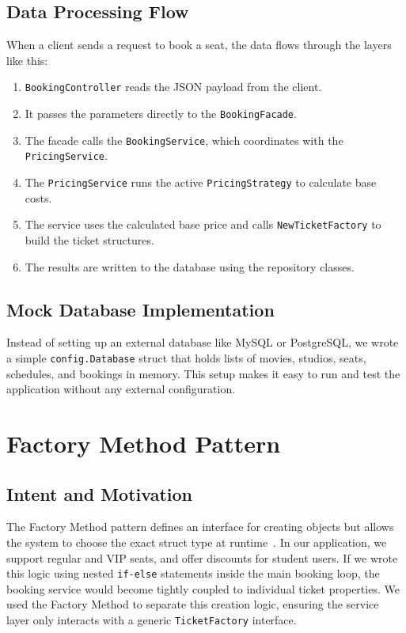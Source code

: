 \documentclass[conference]{IEEEtran}
\begin{document}
\subsection{Data Processing Flow}

When a client sends a request to book a seat, the data flows through the layers like this:

\begin{enumerate}
  \item \texttt{BookingController} reads the JSON payload from the client.
  \item It passes the parameters directly to the \texttt{BookingFacade}.
  \item The facade calls the \texttt{BookingService}, which coordinates with the \texttt{PricingService}.
  \item The \texttt{PricingService} runs the active \texttt{PricingStrategy} to calculate base costs.
  \item The service uses the calculated base price and calls \texttt{NewTicketFactory} to build the ticket structures.
  \item The results are written to the database using the repository classes.
\end{enumerate}

\subsection{Mock Database Implementation}

Instead of setting up an external database like MySQL or PostgreSQL, we wrote a simple \texttt{config.Database} struct that holds lists of movies, studios, seats, schedules, and bookings in memory. This setup makes it easy to run and test the application without any external configuration.

\section{Factory Method Pattern}
\label{sec:factory}

\subsection{Intent and Motivation}

The Factory Method pattern defines an interface for creating objects but allows the system to choose the exact struct type at runtime~\cite{gamma1994design}. In our application, we support regular and VIP seats, and offer discounts for student users. If we wrote this logic using nested \texttt{if-else} statements inside the main booking loop, the booking service would become tightly coupled to individual ticket properties. We used the Factory Method to separate this creation logic, ensuring the service layer only interacts with a generic \texttt{TicketFactory} interface.
\end{document}
